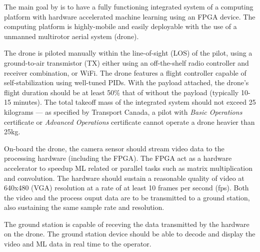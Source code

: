 The main goal by is to have a fully functioning integrated system of a computing platform with hardware accelerated machine learning using an FPGA device. 
The computing platform is highly-mobile and easily deployable with the use of a unmanned multirotor aerial system (drone). 

The drone is piloted manually within the line-of-sight (LOS) of the pilot, using a ground-to-air transmistor (TX) either using an off-the-shelf radio controller and receiver combination, or WiFi. 
The drone features a flight controller capable of self-stabilization using well-tuned PIDs.
With the payload attached, the drone's flight duration should be at least 50\% that of without the payload (typically 10-15 minutes).
The total takeoff mass of the integrated system should not exceed 25 kilograms --- as specified by Transport Canada, a pilot with \textit{Basic Operations}
certificate or \textit{Advanced Operations} certificate cannot operate a drone heavier than 25kg.

On-board the drone, the camera sensor should stream video data to the processing hardware (including the FPGA). 
The FPGA act as a hardware accelerator to speedup ML related or parallel tasks such as matrix multiplication and convolution.
The hardware should sustain a reasonable quality of video at 640x480 (VGA) resolution at a rate of at least 10 frames per second (fps).
Both the video and the process ouput data are to be transmitted to a ground station, also sustaining the same sample rate and resolution.

The ground station is capable of receving the data transmitted by the hardware on the drone. The ground station device should be able
to decode and display the video and ML data in real time to the operator.